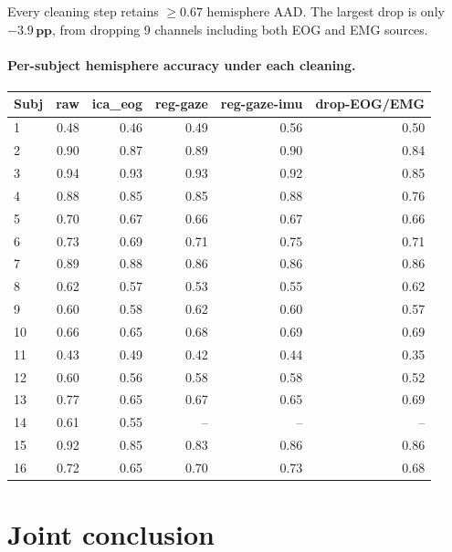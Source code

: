 \noindent
Every cleaning step retains $\geq 0.67$ hemisphere AAD. The largest
drop is only $\mathbf{-3.9\,pp}$, from dropping 9 channels including
both EOG and EMG sources.

\paragraph{Per-subject hemisphere accuracy under each cleaning.}

\begin{table}[ht]
\centering
\begin{tabular}{lrrrrr}
\toprule
Subj & raw & ica\_eog & reg-gaze & reg-gaze-imu & drop-EOG/EMG \\
\midrule
1  & 0.48 & 0.46 & 0.49 & 0.56 & 0.50 \\
2  & 0.90 & 0.87 & 0.89 & 0.90 & 0.84 \\
3  & 0.94 & 0.93 & 0.93 & 0.92 & 0.85 \\
4  & 0.88 & 0.85 & 0.85 & 0.88 & 0.76 \\
5  & 0.70 & 0.67 & 0.66 & 0.67 & 0.66 \\
6  & 0.73 & 0.69 & 0.71 & 0.75 & 0.71 \\
7  & 0.89 & 0.88 & 0.86 & 0.86 & 0.86 \\
8  & 0.62 & 0.57 & 0.53 & 0.55 & 0.62 \\
9  & 0.60 & 0.58 & 0.62 & 0.60 & 0.57 \\
10 & 0.66 & 0.65 & 0.68 & 0.69 & 0.69 \\
11 & 0.43 & 0.49 & 0.42 & 0.44 & 0.35 \\
12 & 0.60 & 0.56 & 0.58 & 0.58 & 0.52 \\
13 & 0.77 & 0.65 & 0.67 & 0.65 & 0.69 \\
14 & 0.61 & 0.55 &  --  &  --  &  --  \\
15 & 0.92 & 0.85 & 0.83 & 0.86 & 0.86 \\
16 & 0.72 & 0.65 & 0.70 & 0.73 & 0.68 \\
\bottomrule
\end{tabular}
\end{table}

\section{Joint conclusion}

